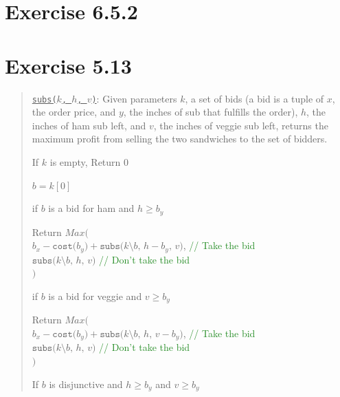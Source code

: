 \documentclass[letterpaper,11pt]{article}
\begin{document}
\section{Exercise 6.5.2}



\section{Exercise 5.13}

\begin{quote}
    \noindent\texttt{\underline{subs($k$, $h$, $v$)}}: Given parameters $k$, a
    set of bids (a bid is a tuple of $x$, the order price, and $y$, the inches of
    sub that fulfills the order), $h$, the inches of ham sub left, and $v$, the
    inches of veggie sub left, returns the maximum profit from selling the two
    sandwiches to the
    set of bidders.
    \begin{steps}
        \item If $k$ is empty, Return $0$
        \item $b = k[0]$
        \item if $b$ is a bid for ham and $h \geq b_y$
        \begin{steps}
            \item Return $Max($
            \\ \hphantom{    } $b_x - \texttt{cost($b_y$)} + \texttt{subs($k \setminus b$, $h-b_y$, $v$)}$, \textcolor{ForestGreen}{// Take the bid}
            \\ \hphantom{    } $\texttt{subs($k \setminus b$, $h$, $v$)}$ \textcolor{ForestGreen}{// Don't take the bid}
            \\ $)$
        \end{steps}
        \item if $b$ is a bid for veggie and $v \geq b_y$
        \begin{steps}
            \item Return $Max($
            \\ \hphantom{    } $b_x - \texttt{cost($b_y$)} + \texttt{subs($k \setminus b$, $h$, $v-b_y$)}$, \textcolor{ForestGreen}{// Take the bid}
            \\ \hphantom{    } $\texttt{subs($k \setminus b$, $h$, $v$)}$ \textcolor{ForestGreen}{// Don't take the bid}
            \\ $)$
        \end{steps}
        \item If $b$ is disjunctive and $h \geq b_y$ and $v \geq b_y$

\end{steps}
\end{quote}
\end{document}
